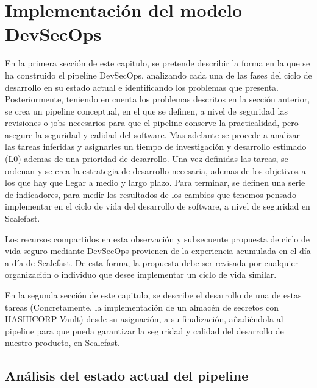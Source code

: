 \documentclass[12pt]{report} %
\begin{document}
\chapter{Implementación del modelo DevSecOps}

En la primera sección de este capitulo, se pretende describir la forma en la que
se ha construido el pipeline DevSecOps, analizando cada una de las fases del
ciclo de desarrollo en su estado actual e identificando los problemas que
presenta.
Posteriormente, teniendo en cuenta los problemas descritos en la
sección anterior, se crea un pipeline conceptual, en el que se definen, a nivel
de seguridad las revisiones o \gls{job}s necesarios para que el \gls{pipeline}
conserve la practicalidad, pero asegure la seguridad y calidad del software.
Mas adelante se procede a analizar las tareas inferidas y asignarles un tiempo
de investigación y desarrollo estimado (L0) ademas de una prioridad de
desarrollo.
Una vez definidas las tareas, se ordenan y se crea la estrategia de
desarrollo necesaria, ademas de los objetivos a los que hay que llegar a medio y
largo plazo.
Para terminar, se definen una serie de indicadores, para medir los
resultados de los cambios que tenemos pensado implementar en el ciclo de vida
del desarrollo de software, a nivel de seguridad en Scalefast.

Los recursos compartidos en esta observación y subsecuente propuesta de ciclo de
vida seguro mediante \gls{DevSecOps} provienen de la experiencia acumulada en el
día a día de Scalefast.
De esta forma, la propuesta debe ser revisada por cualquier organización o
individuo que desee implementar un ciclo de vida similar.

En la segunda sección de este capitulo, se describe el desarrollo de una de
estas tareas (Concretamente, la implementación de un almacén de secretos con 
\href{https://www.hashicorp.com/products/vault}{HASHICORP Vault})
 desde su asignación, a su finalización, añadiéndola al
\gls{pipeline} para que pueda garantizar la seguridad y calidad del desarrollo
de nuestro producto, en Scalefast.

\section{Análisis del estado actual del pipeline} %
\end{document}
